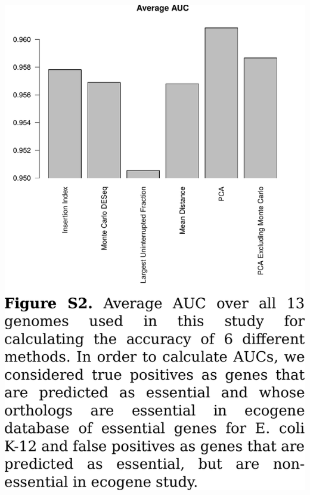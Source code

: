 \documentclass{article}
\newcommand{\Newpage}{\end{preview}\begin{preview}}
\begin{document}
\begin{preview}
\includegraphics{suppl2.pdf}
\Newpage

\end{preview}
\end{document}
